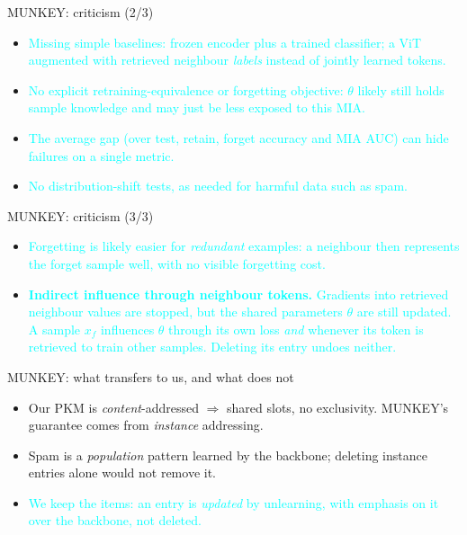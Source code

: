 \documentclass{beamer}
\newcommand{\pierre}[1]{\textcolor{cyan}{#1}}
\begin{document}
\begin{frame}{MUNKEY: criticism (2/3)}
\begin{itemize}
  \item \pierre{Missing simple baselines: frozen encoder plus a trained
        classifier; a ViT augmented with retrieved neighbour \emph{labels}
        instead of jointly learned tokens.}
  \item \pierre{No explicit retraining-equivalence or forgetting objective:
        $\theta$ likely still holds sample knowledge and may just be less
        exposed to this MIA.}
  \item \pierre{The average gap (over test, retain, forget accuracy and MIA AUC)
        can hide failures on a single metric.}
  \item \pierre{No distribution-shift tests, as needed for harmful data such as
        spam.}
\end{itemize}
\end{frame}

\begin{frame}{MUNKEY: criticism (3/3)}
\begin{itemize}
  \item \pierre{Forgetting is likely easier for \emph{redundant} examples: a
        neighbour then represents the forget sample well, with no visible
        forgetting cost.}
  \item \pierre{\textbf{Indirect influence through neighbour tokens.} Gradients
        into retrieved neighbour values are stopped, but the shared parameters
        $\theta$ are still updated. A sample $x_f$ influences $\theta$ through
        its own loss \emph{and} whenever its token is retrieved to train other
        samples. Deleting its entry undoes neither.}
\end{itemize}
\end{frame}

\begin{frame}{MUNKEY: what transfers to us, and what does not}
\begin{itemize}
  \item Our PKM is \emph{content}-addressed $\Rightarrow$ shared slots, no
        exclusivity. MUNKEY's guarantee comes from \emph{instance} addressing.
  \item Spam is a \emph{population} pattern learned by the backbone; deleting
        instance entries alone would not remove it.
  \item \pierre{We keep the items: an entry is \emph{updated} by unlearning, with
        emphasis on it over the backbone, not deleted.}
\end{itemize}
\end{frame}
\end{document}
